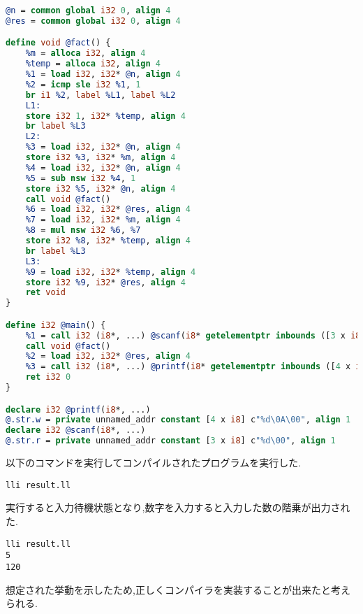 \documentclass[main]{subfiles}
\begin{document}
\begin{lstlisting}[caption=pl0c.pのコンパイルで生成されたresult.ll,language=LLVM]
@n = common global i32 0, align 4
@res = common global i32 0, align 4

define void @fact() {
    %m = alloca i32, align 4
    %temp = alloca i32, align 4
    %1 = load i32, i32* @n, align 4
    %2 = icmp sle i32 %1, 1
    br i1 %2, label %L1, label %L2
    L1:
    store i32 1, i32* %temp, align 4
    br label %L3
    L2:
    %3 = load i32, i32* @n, align 4
    store i32 %3, i32* %m, align 4
    %4 = load i32, i32* @n, align 4
    %5 = sub nsw i32 %4, 1
    store i32 %5, i32* @n, align 4
    call void @fact()
    %6 = load i32, i32* @res, align 4
    %7 = load i32, i32* %m, align 4
    %8 = mul nsw i32 %6, %7
    store i32 %8, i32* %temp, align 4
    br label %L3
    L3:
    %9 = load i32, i32* %temp, align 4
    store i32 %9, i32* @res, align 4
    ret void
}

define i32 @main() {
    %1 = call i32 (i8*, ...) @scanf(i8* getelementptr inbounds ([3 x i8], [3 x i8]* @.str.r, i64 0, i64 0), i32* @n)
    call void @fact()
    %2 = load i32, i32* @res, align 4
    %3 = call i32 (i8*, ...) @printf(i8* getelementptr inbounds ([4 x i8], [4 x i8]* @.str.w, i64 0, i64 0), i32 %2)
    ret i32 0
}

declare i32 @printf(i8*, ...)
@.str.w = private unnamed_addr constant [4 x i8] c"%d\0A\00", align 1
declare i32 @scanf(i8*, ...)
@.str.r = private unnamed_addr constant [3 x i8] c"%d\00", align 1
\end{lstlisting}
以下のコマンドを実行してコンパイルされたプログラムを実行した.
\begin{oframed}
\begin{verbatim}
lli result.ll
\end{verbatim}
\end{oframed}
実行すると入力待機状態となり,数字を入力すると入力した数の階乗が出力された.
\begin{lstlisting}[caption=pl0c.pをコンパイルしたプログラムを実行]
lli result.ll
5
120
\end{lstlisting}
想定された挙動を示したため,正しくコンパイラを実装することが出来たと考えられる.
\end{document}
